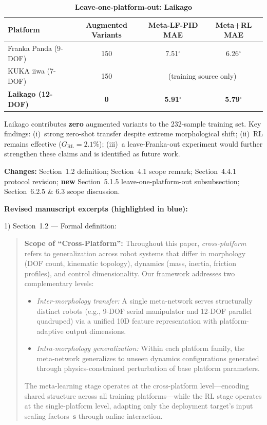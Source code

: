 \documentclass[11pt,a4paper]{article}
\begin{document}
\begin{table}[h]
\centering\small
\caption*{\textbf{Leave-one-platform-out: Laikago}}
\begin{tabular}{lccc}
\toprule
Platform & Augmented Variants & Meta-LF-PID MAE & Meta+RL MAE \\
\midrule
Franka Panda (9-DOF) & 150 & 7.51$^\circ$ & 6.26$^\circ$ \\
KUKA iiwa (7-DOF) & 150 & \multicolumn{2}{c}{(training source only)} \\
\textbf{Laikago (12-DOF)} & \textbf{0} & \textbf{5.91$^\circ$} & \textbf{5.79$^\circ$} \\
\bottomrule
\end{tabular}
\end{table}

Laikago contributes \textbf{zero} augmented variants to the 232-sample training set. Key findings: (i)~strong zero-shot transfer despite extreme morphological shift; (ii)~RL remains effective ($G_{\mathrm{RL}}=2.1\%$); (iii)~a leave-Franka-out experiment would further strengthen these claims and is identified as future work.

\textbf{Changes:} Section~1.2 definition; Section~4.1 scope remark; Section~4.4.1 protocol revision; \textbf{new} Section~5.1.5 leave-one-platform-out subsubsection; Section~6.2.5 \& 6.3 scope discussion.

\textbf{Revised manuscript excerpts (highlighted in blue):}

1) Section~1.2 --- Formal definition:

\begin{quote}\color{blue}\small
\textbf{Scope of ``Cross-Platform'':} Throughout this paper, \textit{cross-platform} refers to generalization across robot systems that differ in morphology (DOF count, kinematic topology), dynamics (mass, inertia, friction profiles), and control dimensionality. Our framework addresses two complementary levels:
\begin{itemize}[leftmargin=*]
    \item \textit{Inter-morphology transfer:} A single meta-network serves structurally distinct robots (e.g., 9-DOF serial manipulator and 12-DOF parallel quadruped) via a unified 10D feature representation with platform-adaptive output dimensions.
    \item \textit{Intra-morphology generalization:} Within each platform family, the meta-network generalizes to unseen dynamics configurations generated through physics-constrained perturbation of base platform parameters.
\end{itemize}
The meta-learning stage operates at the cross-platform level---encoding shared structure across all training platforms---while the RL stage operates at the single-platform level, adapting only the deployment target's input scaling factors~$\bm{s}$ through online interaction.
\end{quote}
\end{document}
